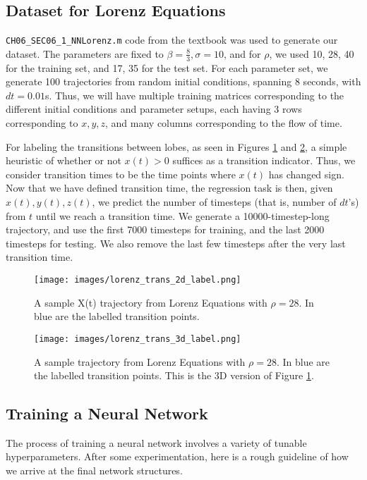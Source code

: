 \documentclass[letterpaper, 10 pt, conference]{ieeeconf}  %
\begin{document}
\subsection{Dataset for Lorenz Equations}
\label{section:data_lorenz}
\texttt{CH06\_SEC06\_1\_NNLorenz.m} code from the textbook \cite{brunton2019data} was used to generate our dataset.
The parameters are fixed to $\beta = \frac{8}{3}, \sigma = 10$, and for $\rho$, we used 10, 28, 40  for the training set, and 17, 35 for the test set. For each parameter set, we generate 100 trajectories from random initial conditions, spanning 8 seconds, with $dt = 0.01$s.
Thus, we will have multiple training matrices corresponding to the different initial conditions and parameter setups, each having 3 rows corresponding to $x, y, z$, and many columns corresponding to the flow of time.

For labeling the transitions between lobes, as seen in Figures \ref{fig:lorenz_trans_2d_label} and \ref{fig:lorenz_trans_3d_label}, a simple heuristic of whether or not $x(t) > 0$ suffices as a transition indicator. Thus, we consider transition times to be the time points where $x(t)$ has changed sign. Now that we have defined transition time, the regression task is then, given $x(t), y(t), z(t)$, we predict the number of timesteps (that is, number of $dt$'s) from $t$ until we reach a transition time. We generate a 10000-timestep-long trajectory, and use the first 7000 timesteps for training, and the last 2000 timesteps for testing. We also remove the last few timesteps after the very last transition time.

\begin{figure}[htb]
\centering
\texttt{[image: images/lorenz\_trans\_2d\_label.png]}
\caption{A sample X(t) trajectory from Lorenz Equations with $\rho = 28$. In blue are the labelled transition points.}
\label{fig:lorenz_trans_2d_label}
\end{figure}

\begin{figure}[htb]
\centering
\texttt{[image: images/lorenz\_trans\_3d\_label.png]}
\caption{A sample trajectory from Lorenz Equations with $\rho = 28$. In blue are the labelled transition points. This is the 3D version of Figure \ref{fig:lorenz_trans_2d_label}.}
\label{fig:lorenz_trans_3d_label}
\end{figure}

\subsection{Training a Neural Network}
The process of training a neural network involves a variety of tunable hyperparameters. After some experimentation, here is a rough guideline of how we arrive at the final network structures.
\end{document}
